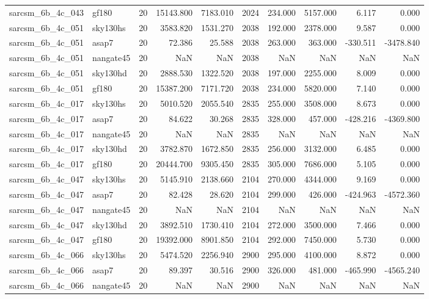 \begin{tabular}{llrrrrrrrr}
sarcsm\_6b\_4c\_043 & gf180 & 20 & 15143.800 & 7183.010 & 2024 & 234.000 & 5157.000 & 6.117 & 0.000 \\
sarcsm\_6b\_4c\_051 & sky130hs & 20 & 3583.820 & 1531.270 & 2038 & 192.000 & 2378.000 & 9.587 & 0.000 \\
sarcsm\_6b\_4c\_051 & asap7 & 20 & 72.386 & 25.588 & 2038 & 263.000 & 363.000 & -330.511 & -3478.840 \\
sarcsm\_6b\_4c\_051 & nangate45 & 20 & NaN & NaN & 2038 & NaN & NaN & NaN & NaN \\
sarcsm\_6b\_4c\_051 & sky130hd & 20 & 2888.530 & 1322.520 & 2038 & 197.000 & 2255.000 & 8.009 & 0.000 \\
sarcsm\_6b\_4c\_051 & gf180 & 20 & 15387.200 & 7171.720 & 2038 & 234.000 & 5820.000 & 7.140 & 0.000 \\
sarcsm\_6b\_4c\_017 & sky130hs & 20 & 5010.520 & 2055.540 & 2835 & 255.000 & 3508.000 & 8.673 & 0.000 \\
sarcsm\_6b\_4c\_017 & asap7 & 20 & 84.622 & 30.268 & 2835 & 328.000 & 457.000 & -428.216 & -4369.800 \\
sarcsm\_6b\_4c\_017 & nangate45 & 20 & NaN & NaN & 2835 & NaN & NaN & NaN & NaN \\
sarcsm\_6b\_4c\_017 & sky130hd & 20 & 3782.870 & 1672.850 & 2835 & 256.000 & 3132.000 & 6.485 & 0.000 \\
sarcsm\_6b\_4c\_017 & gf180 & 20 & 20444.700 & 9305.450 & 2835 & 305.000 & 7686.000 & 5.105 & 0.000 \\
sarcsm\_6b\_4c\_047 & sky130hs & 20 & 5145.910 & 2138.660 & 2104 & 270.000 & 4344.000 & 9.169 & 0.000 \\
sarcsm\_6b\_4c\_047 & asap7 & 20 & 82.428 & 28.620 & 2104 & 299.000 & 426.000 & -424.963 & -4572.360 \\
sarcsm\_6b\_4c\_047 & nangate45 & 20 & NaN & NaN & 2104 & NaN & NaN & NaN & NaN \\
sarcsm\_6b\_4c\_047 & sky130hd & 20 & 3892.510 & 1730.410 & 2104 & 272.000 & 3500.000 & 7.466 & 0.000 \\
sarcsm\_6b\_4c\_047 & gf180 & 20 & 19392.000 & 8901.850 & 2104 & 292.000 & 7450.000 & 5.730 & 0.000 \\
sarcsm\_6b\_4c\_066 & sky130hs & 20 & 5474.520 & 2256.940 & 2900 & 295.000 & 4100.000 & 8.872 & 0.000 \\
sarcsm\_6b\_4c\_066 & asap7 & 20 & 89.397 & 30.516 & 2900 & 326.000 & 481.000 & -465.990 & -4565.240 \\
sarcsm\_6b\_4c\_066 & nangate45 & 20 & NaN & NaN & 2900 & NaN & NaN & NaN & NaN \\

\end{tabular}
